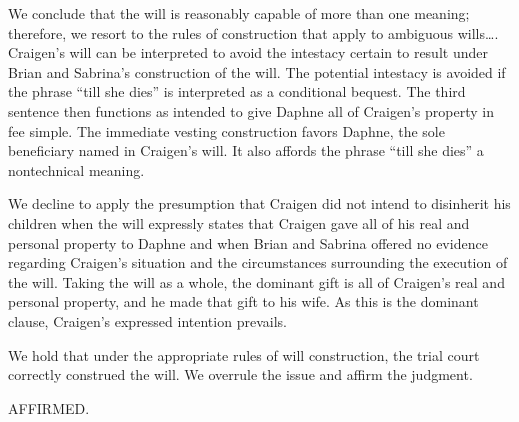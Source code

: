 We conclude that the will is reasonably capable of more than one meaning;
therefore, we resort to the rules of construction that apply to ambiguous
wills\dots. Craigen's will can be interpreted to avoid the intestacy certain
to result under Brian and Sabrina's construction of the will. The potential
intestacy is avoided if the phrase ``till she dies'' is interpreted as a
conditional bequest. The third sentence then functions as intended to give
Daphne all of Craigen's property in fee simple. The immediate vesting
construction favors Daphne, the sole beneficiary named in Craigen's will. It
also affords the phrase ``till she dies'' a nontechnical meaning.

We decline to apply the presumption that Craigen did not intend to disinherit
his children when the will expressly states that Craigen gave all of his real
and personal property to Daphne and when Brian and Sabrina offered no evidence
regarding Craigen's situation and the circumstances surrounding the execution
of the will. Taking the will as a whole, the dominant gift is all of Craigen's
real and personal property, and he made that gift to his wife. As this is the
dominant clause, Craigen's expressed intention prevails.

We hold that under the appropriate rules of will construction, the trial court
correctly construed the will. We overrule the issue and affirm the judgment.

AFFIRMED.

